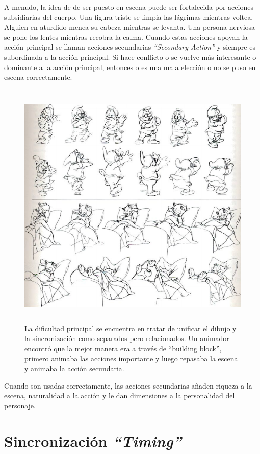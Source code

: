 \documentclass[a4paper,12pt]{report}
\begin{document}
 
A menudo, la idea de de ser puesto en escena puede ser fortalecida por acciones subsidiarias del cuerpo. 
Una figura triste se limpia las lágrimas mientras voltea. 
Alguien en aturdido menea su cabeza mientras se levanta. 
Una persona nerviosa se pone los lentes mientras recobra la calma. 
Cuando estas acciones apoyan la acción principal se llaman acciones secundarias \textit{``Secondary Action''} 
y siempre es subordinada a la acción principal. Si hace conflicto o se vuelve más interesante o dominante a la acción principal,
entonces o es una mala elección o no se puso en escena correctamente.\cite{principles_animation}
 
\begin{figure}[ht]
    \centering
    \includegraphics[height=12cm]{Imagenes/secundary_action}
    \caption{La dificultad principal se encuentra en tratar de unificar el dibujo
    y la sincronización como separados pero relacionados. Un animador encontró que la mejor manera era a través de ``building block'', primero animaba las acciones importante y luego repasaba la escena y animaba la acción secundaria.}
    \label{fig:secundary_action}
\end{figure}
 
 
Cuando son usadas correctamente, las acciones secundarias añaden riqueza a la escena, naturalidad a la acción y le dan dimensiones a la personalidad del personaje.
 
 
\section{Sincronización \textit{``Timing''}}
 
\end{document}
